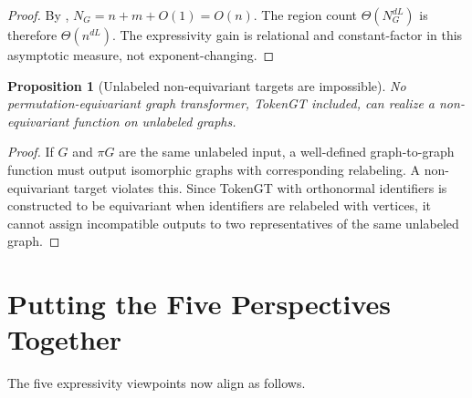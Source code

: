 \documentclass[11pt]{article}
\newtheorem{proposition}[theorem]{Proposition}
\begin{document}
\begin{proof}
By , $N_G=n+m+O(1)=O(n)$.  The region count $\Theta(N_G^{dL})$ is therefore $\Theta(n^{dL})$.  The expressivity gain is relational and constant-factor in this asymptotic measure, not exponent-changing.
\end{proof}

\begin{proposition}[Unlabeled non-equivariant targets are impossible]
No permutation-equivariant graph transformer, TokenGT included, can realize a non-equivariant function on unlabeled graphs.
\end{proposition}

\begin{proof}
If $G$ and $\pi G$ are the same unlabeled input, a well-defined graph-to-graph function must output isomorphic graphs with corresponding relabeling.  A non-equivariant target violates this.  Since TokenGT with orthonormal identifiers is constructed to be equivariant when identifiers are relabeled with vertices, it cannot assign incompatible outputs to two representatives of the same unlabeled graph.
\end{proof}

\section{Putting the Five Perspectives Together}

The five expressivity viewpoints now align as follows.
\end{document}
